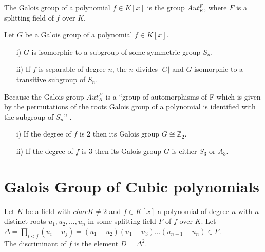 \begin{definition} \cite{hunger}
  The Galois group of a polynomial \(f \in K[x]\) is the group \(Aut_K^F\), where \(F\) is a splitting field of \(f\) over \(K\).
\end{definition}
\begin{theorem} \cite{hunger} Let \(G\) be a Galois group of a polynomial \(f \in K[x]\).
\begin{enumerate}
\item[i)] \(G\) is isomorphic to a subgroup of some symmetric group \(S_n\).
\item[ii)] If \(f\) is separable of degree \(n\), the \(n\) divides \(|G|\) and \(G\) isomorphic to a transitive subgroup of \(S_n\).  \end{enumerate}
\end{theorem}
Because the Galois group \(Aut_K^F\) is a ``group of automorphisms of F which is given by the permutations of the roots Galois group of a polynomial is identified with the subgroup of \(S_n\)'' \cite{hunger}.
\vspace{3mm}

\begin{corollary}
\begin{enumerate}
 \cite{hunger} \item[i)] If the degree of \(f\) is \(2\) then its Galois group \(G \cong {\mathbb{Z}}_2\).
  \item[ii)] If the degree of \(f\) is \(3\) then its Galois group \(G\) is either \(S_3\) or \(A_3\).
  \end{enumerate}
\end{corollary}

\vspace{-2mm}
\section{Galois Group of Cubic polynomials}
\begin{definition} \cite{hunger}
  Let \(K\) be a field with \(char K \neq 2\) and \(f \in K[x]\) a polynomial of degree \(n\) with \(n\) distinct roots \(u_1,u_2,...,u_n\) in some splitting field \(F\) of \(f\) over \(K\). Let \(\Delta = \prod\limits_{i<j}(u_i-u_j) = (u_1-u_2)(u_1-u_3)...(u_{n-1}-u_n) \in F\).\\
  The discriminant of \(f\) is the element \(D= {\Delta}^2\).
\end{definition}

